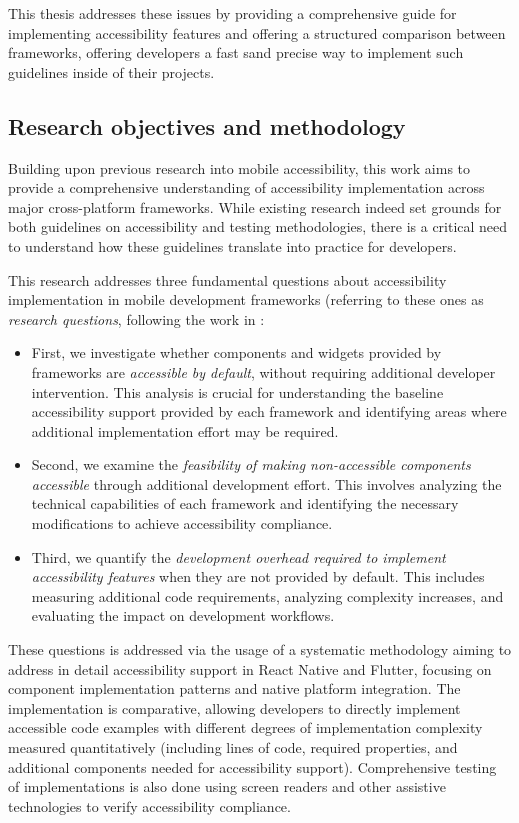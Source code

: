 This thesis addresses these issues by providing a comprehensive guide for implementing accessibility features and offering a structured comparison between frameworks, offering developers a fast sand precise way to implement such guidelines inside of their projects. 

\subsection{Research objectives and methodology}

Building upon previous research into mobile accessibility, this work aims to provide a comprehensive understanding of accessibility implementation across major cross-platform frameworks. While existing research indeed set grounds for both guidelines on accessibility and testing methodologies, there is a critical need to understand how these guidelines translate into practice for developers. 

This research addresses three fundamental questions about accessibility implementation in mobile development frameworks (referring to these ones as \textit{research questions}, following the work in \cite{perinello2024accessibility}:

\begin{itemize}
    \item First, we investigate whether components and widgets provided by frameworks are \textit{accessible by default}, without requiring additional developer intervention. This analysis is crucial for understanding the baseline accessibility support provided by each framework and identifying areas where additional implementation effort may be required.
    \item Second, we examine the \textit{feasibility of making non-accessible components accessible} through additional development effort. This involves analyzing the technical capabilities of each framework and identifying the necessary modifications to achieve accessibility compliance.
    \item Third, we quantify the \textit{development overhead required to implement accessibility features} when they are not provided by default. This includes measuring additional code requirements, analyzing complexity increases, and evaluating the impact on development workflows.
\end{itemize}

These questions is addressed via the usage of a systematic methodology aiming to address in detail accessibility support in React Native and Flutter, focusing on component implementation patterns and native platform integration. The implementation is comparative, allowing developers to directly implement accessible code examples with different degrees of implementation complexity measured quantitatively (including lines of code, required properties, and additional components needed for accessibility support). Comprehensive testing of implementations is also done using screen readers and other assistive technologies to verify accessibility compliance.

